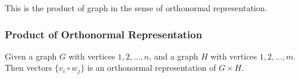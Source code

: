       \begin{frame}
            This is the product of graph in the sense of orthonormal representation.

            \frametitle{Product of Orthonormal Representation}
            \begin{lemma}
                  Given a graph $ G $ with vertices $ 1,2,\dots,n $, and a graph $ H $ with vertices $ 1,2,\dots,m $. Then vectors $\{ v_{i}\circ w_{j} \}$ is an orthonormal representation of $ G \times H $.
            \end{lemma}
      \end{frame}